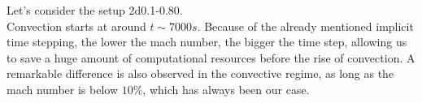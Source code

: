 Let's consider the setup 2d0.1-0.80. \\
Convection starts at around $t \sim 7000 s$. Because of the already mentioned implicit time stepping, the lower the mach number, the bigger the time step, allowing us to save a huge amount of computational resources before the rise of convection. A remarkable difference is also observed in the convective regime, as long as the mach number is below $10 \%$, which has always been our case.\\
\begin{figure}[t!]
  \centering
      \hfill
	\hfill
  \centering
      \hfill

\end{figure}
